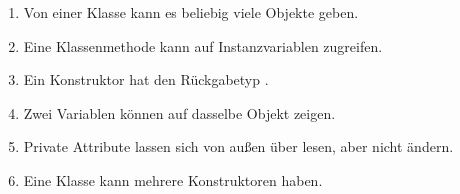 \begin{enumerate}[label=\alph*)]
\item Von einer Klasse kann es beliebig viele Objekte geben.
\item Eine Klassenmethode kann auf Instanzvariablen zugreifen.
\item Ein Konstruktor hat den Rückgabetyp .
\item Zwei Variablen können auf dasselbe Objekt zeigen.
\item Private Attribute lassen sich von außen über  lesen, aber nicht ändern.
\item Eine Klasse kann mehrere Konstruktoren haben.
\end{enumerate}
